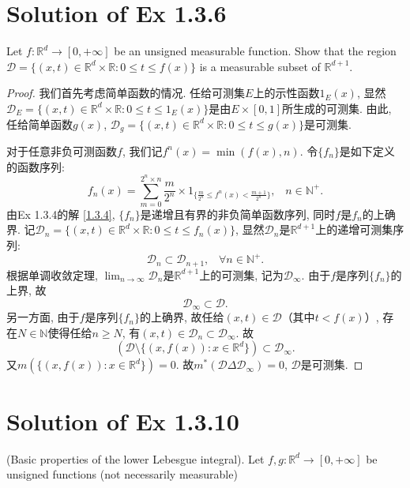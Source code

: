 \documentclass[reqno,a4paper,10pt]{amsart}
\newcommand\Rnum{\mathbb{R}}
\begin{document}
\section{Solution of Ex 1.3.6}\label{1.3.6}
Let $f: \mathbb{R}^d\to [0,+\infty]$ be an unsigned measurable function. Show that the region $\mathcal{D}=\{(x,t)\in \mathbb{R}^d\times \mathbb{R} : 0\leq t\leq f(x)\}$ is a measurable subset of $\mathbb{R}^{d+1}$. 
\begin{proof}
    我们首先考虑简单函数的情况. 任给可测集$E$上的示性函数$1_{E}(x)$, 显然$\mathcal{D}_{E}=\{(x,t)\in \mathbb{R}^d\times \mathbb{R} : 0\leq t\leq 1_E(x)\}$是由$E\times [0,1]$所生成的可测集. 由此, 任给简单函数$g(x)$, $\mathcal{D}_{g}=\{(x,t)\in \mathbb{R}^d\times \mathbb{R} : 0\leq t\leq g(x)\}$是可测集. 
    
    对于任意非负可测函数$f$, 我们记$f^n(x)=\min (f(x),n)$. 令$\{f_n\}$是如下定义的函数序列: 
    \begin{equation*}
        f_n(x)=\sum_{m=0}^{2^n\times n} \frac{m}{2^n}\times 1_{\{\frac{m}{2^n}\leq f^n(x)<\frac{m+1}{2^n}\}},\;\;\; n\in\mathbb{N}^+.
    \end{equation*}
    由Ex 1.3.4的解 \ref{1.3.4}, $\{f_n\}$是递增且有界的非负简单函数序列, 同时$f$是$f_n$的上确界. 记$\mathcal{D}_n=\{(x,t)\in \mathbb{R}^d\times \mathbb{R} : 0\leq t\leq f_n(x)\}$, 显然$\mathcal{D}_n$是$\Rnum^{d+1}$上的递增可测集序列: 
    \begin{equation*}
        \mathcal{D}_n\subset \mathcal{D}_{n+1},\;\;\; \forall n\in\mathbb{N}^+.
    \end{equation*}
    根据单调收敛定理, $\lim_{n\to\infty}\mathcal{D}_{n}$是$\Rnum^{d+1}$上的可测集, 记为$\mathcal{D}_{\infty}$. 由于$f$是序列$\{f_n\}$的上界, 故
    \begin{equation*}
        \mathcal{D}_{\infty}\subset \mathcal{D}.
    \end{equation*}
    另一方面, 由于$f$是序列$\{f_n\}$的上确界, 故任给$(x,t)\in\mathcal{D}$（其中$t<f(x)$）, 存在$N\in\mathbb{N}$使得任给$n\geq N$, 有$(x,t)\in \mathcal{D}_n\subset\mathcal{D}_{\infty}$. 故
    \begin{equation*}
        (\mathcal{D}\setminus\{(x,f(x)):x\in\Rnum^d\})\subset \mathcal{D}_\infty.
    \end{equation*}
    又$m(\{(x,f(x)):x\in\Rnum^d\})=0$. 故$m^*(\mathcal{D}\Delta \mathcal{D}_\infty)=0$, $\mathcal{D}$是可测集. 
\end{proof}


\section{Solution of Ex 1.3.10}
(Basic properties of the lower Lebesgue integral). Let $f,g:\Rnum^d\to [0,+\infty]$ be unsigned functions (not necessarily measurable)
\end{document}

